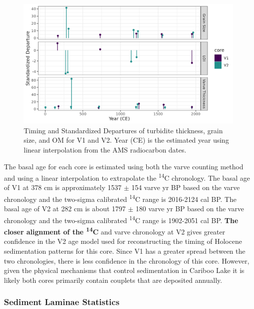 \documentclass[Royal,times,doublespace,sageh]{sagej}
\begin{document}
\begin{figure}

{\centering \includegraphics[width=1\linewidth]{figs/turbidite_plot} 

}

\caption{Timing and Standardized Departures of turbidite thickness, grain size, and OM for V1 and V2. Year (CE) is the estimated year using linear interpolation from the AMS radiocarbon dates.\label{turbScatter}}\label{fig:turbScatter}
\end{figure}

The basal age for each core is estimated using both the varve counting
method and using a linear interpolation to extrapolate the
\textsuperscript{14}C chronology. The basal age of V1 at 378 cm is
approximately 1537 \(\pm\) 154 varve yr BP based on the varve chronology
and the two-sigma calibrated \textsuperscript{14}C range is 2016-2124
cal BP. The basal age of V2 at 282 cm is about 1797 \(\pm\) 180 varve yr
BP based on the varve chronology and the two-sigma calibrated
\textsuperscript{14}C range is 1902-2051 cal BP. \textbf{The closer
alignment of the \textsuperscript{14}C} and varve chronology at V2 gives
greater confidence in the V2 age model used for reconstructing the
timing of Holocene sedimentation patterns for this core. Since V1 has a
greater spread between the two chronologies, there is less confidence in
the chronology of this core. However, given the physical mechanisms that
control sedimentation in Cariboo Lake it is likely both cores primarily
contain couplets that are deposited annually.

\hypertarget{sediment-laminae-statistics}{%
\subsubsection{Sediment Laminae
Statistics}\label{sediment-laminae-statistics}}
\end{document}
